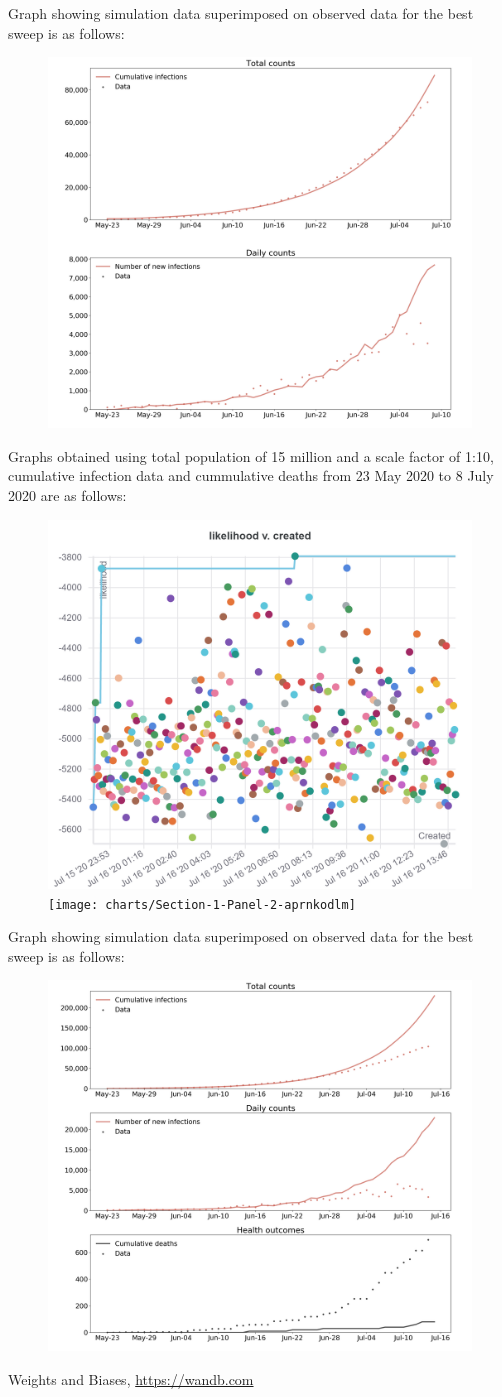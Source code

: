 \documentclass{article}
\begin{document}
\newpage
Graph showing simulation data superimposed on observed data for the best sweep is as follows: 
\begin{figure}[ht]
	\includegraphics[width=0.5\linewidth]{charts/Best_fit}
\end{figure}

Graphs obtained using total population of 15 million and a scale factor of 1:10,  cumulative infection data and cummulative deaths from 23 May 2020 to 8 July 2020 are as follows: \\    
\begin{figure}[ht]
	\includegraphics[width=0.5\linewidth]{charts/Section-1-Panel-0-90491c2ri}
	\texttt{[image: charts/Section-1-Panel-2-aprnkodlm]}
\end{figure}

Graph showing simulation data superimposed on observed data for the best sweep is as follows: 
\begin{figure}[ht]
	\includegraphics[width=0.5\linewidth]{charts/Best_fit2}
\end{figure}



\newpage
\begin{thebibliography}{9}
  Weights and Biases,
  \href{https://app.wandb.ai/mudimu/covasim/reports/SA-Calibration---VmlldzoyMDQ0MDk}{https://wandb.com}
\end{thebibliography}
\end{document}
